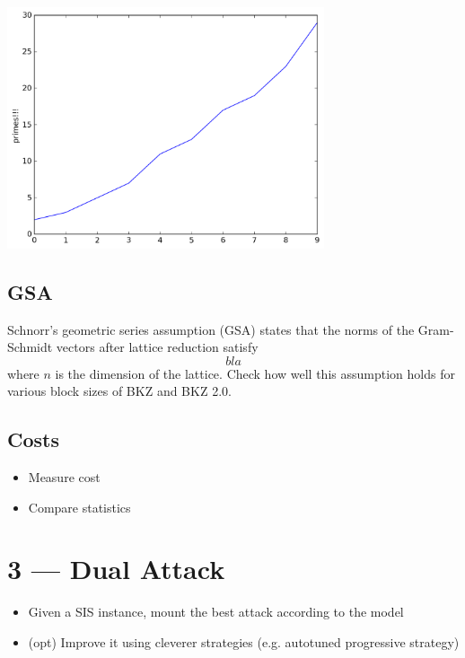 \documentclass[10pt,a4paper]{tufte-handout}
\begin{document}
\begin{center}
\includegraphics[width=0.7\textwidth]{./line-plot-matplotlib.png}
\end{center} 

\subsection{GSA}
\label{sec:org29efaef}

Schnorr’s geometric series assumption (GSA) states that the norms of the Gram-Schmidt vectors after lattice reduction satisfy \[bla \] where \(n\) is the dimension of the lattice. Check how well this assumption holds for various block sizes of BKZ and BKZ 2.0.

\subsection{Costs}
\label{sec:orgbe989f2}

\begin{itemize}
\item Measure cost

\item Compare statistics
\end{itemize}

\section{3 — Dual Attack}
\label{sec:orgfb1fa63}

\begin{itemize}
\item Given a SIS instance, mount the best attack according to the model

\item (opt) Improve it using cleverer strategies (e.g. autotuned progressive strategy)
\end{itemize}
\end{document}
